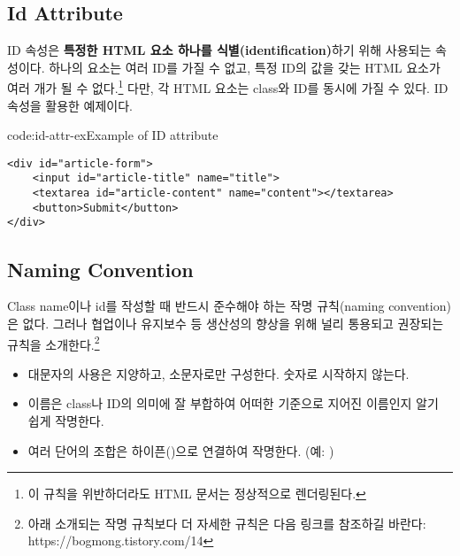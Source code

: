 \subsection*{Id Attribute}
ID 속성은 \textbf{특정한 HTML 요소 하나를 식별(identification)}하기 위해 사용되는 속성이다. 하나의 요소는 여러 ID를 가질 수 없고, 특정 ID의 값을 갖는 HTML 요소가 여러 개가 될 수 없다.\footnote{이 규칙을 위반하더라도 HTML 문서는 정상적으로 렌더링된다.} 다만, 각 HTML 요소는 class와 ID를 동시에 가질 수 있다. \은 ID 속성을 활용한 예제이다.

\begin{code}{code:id-attr-ex}{Example of ID attribute}
\begin{verbatim}
<div id="article-form">
    <input id="article-title" name="title">
    <textarea id="article-content" name="content"></textarea>
    <button>Submit</button>
</div>
\end{verbatim}
\end{code}

\subsection*{Naming Convention}
Class name이나 id를 작성할 때 반드시 준수해야 하는 작명 규칙(naming convention)은 없다. 그러나 협업이나 유지보수 등 생산성의 향상을 위해 널리 통용되고 권장되는 규칙을 소개한다.\footnote{아래 소개되는 작명 규칙보다 더 자세한 규칙은 다음 링크를 참조하길 바란다: https://bogmong.tistory.com/14}

\begin{itemize}
    \item 대문자의 사용은 지양하고, 소문자로만 구성한다. 숫자로 시작하지 않는다.
    \item 이름은 class나 ID의 의미에 잘 부합하여 어떠한 기준으로 지어진 이름인지 알기 쉽게 작명한다.
    \item 여러 단어의 조합은 하이픈(\cd{-})으로 연결하여 작명한다. (예: )
\end{itemize}
